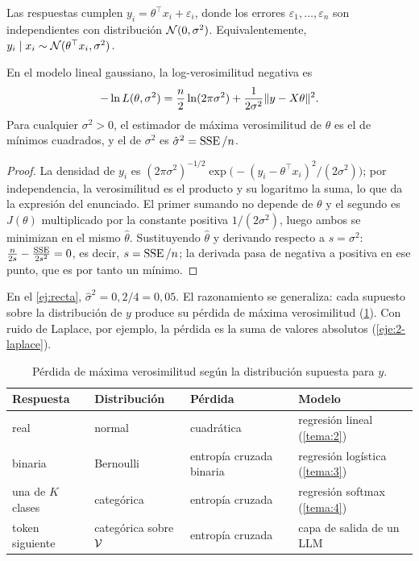 \begin{definicion}
Las respuestas cumplen $y_i=\theta^{\top}x_i+\varepsilon_i$, donde los errores $\varepsilon_1,\dots,\varepsilon_n$ son independientes con distribución $\mathcal{N}(0,\sigma^{2})$. Equivalentemente, $y_i\mid x_i\sim\mathcal{N}(\theta^{\top}x_i,\sigma^{2})$.
\end{definicion}

\begin{teorema}\label{teo:mv-gauss}
En el modelo lineal gaussiano, la log-verosimilitud negativa es
\[
-\ln L(\theta,\sigma^{2})=\frac{n}{2}\ln(2\pi\sigma^{2})+\frac{1}{2\sigma^{2}}\lVert y-X\theta\rVert^{2}.
\]
Para cualquier $\sigma^{2}>0$, el estimador de máxima verosimilitud de $\theta$ es el de mínimos cuadrados, y el de $\sigma^{2}$ es $\hat\sigma^{2}=\operatorname{SSE}/n$.
\end{teorema}

\begin{proof}
La densidad de $y_i$ es $(2\pi\sigma^{2})^{-1/2}\exp\bigl(-(y_i-\theta^{\top}x_i)^{2}/(2\sigma^{2})\bigr)$; por independencia, la verosimilitud es el producto y su logaritmo la suma, lo que da la expresión del enunciado. El primer sumando no depende de $\theta$ y el segundo es $J(\theta)$ multiplicado por la constante positiva $1/(2\sigma^{2})$, luego ambos se minimizan en el mismo $\hat\theta$. Sustituyendo $\hat\theta$ y derivando respecto a $s=\sigma^{2}$: $\frac{n}{2s}-\frac{\operatorname{SSE}}{2s^{2}}=0$, es decir, $s=\operatorname{SSE}/n$; la derivada pasa de negativa a positiva en ese punto, que es por tanto un mínimo.
\end{proof}

En el \cref{ej:recta}, $\hat\sigma^{2}=0{,}2/4=0{,}05$. El razonamiento se generaliza: cada supuesto sobre la distribución de $y$ produce su pérdida de máxima verosimilitud (\cref{tab:mv}). Con ruido de Laplace, por ejemplo, la pérdida es la suma de valores absolutos (\cref{eje:2-laplace}).

\begin{table}[h]
\centering\small
\caption{Pérdida de máxima verosimilitud según la distribución supuesta para $y$.}\label{tab:mv}
\begin{tabular}{@{}llll@{}}
\toprule
Respuesta & Distribución & Pérdida & Modelo \\
\midrule
real & normal & cuadrática & regresión lineal (\cref{tema:2}) \\
binaria & Bernoulli & entropía cruzada binaria & regresión logística (\cref{tema:3}) \\
una de $K$ clases & categórica & entropía cruzada & regresión softmax (\cref{tema:4}) \\
token siguiente & categórica sobre $\mathcal{V}$ & entropía cruzada & capa de salida de un LLM \\
\bottomrule
\end{tabular}
\end{table}

